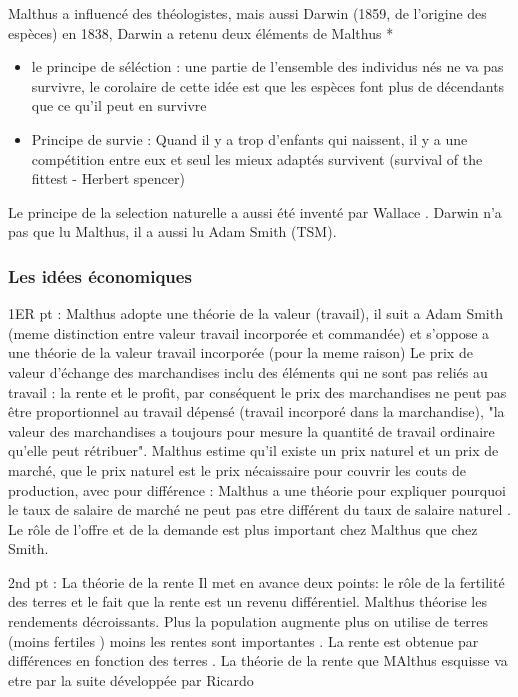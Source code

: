 \documentclass{article}
\begin{document}
Malthus a influencé des théologistes, mais aussi Darwin (1859, de l'origine des espèces) en 1838, Darwin a retenu deux éléments de Malthus *
\begin{itemize}
\item le principe de séléction : une partie de l'ensemble des individus nés ne va pas survivre, le corolaire de cette idée est que les espèces font plus de décendants que ce qu'il peut en survivre 
\item Principe de survie : Quand il y a trop d'enfants qui naissent, il y a une compétition entre eux et seul les mieux adaptés survivent (survival of the fittest - Herbert spencer) 
\end{itemize}
Le principe de la selection naturelle a aussi été inventé par Wallace .
Darwin n'a pas que lu Malthus, il a aussi lu Adam Smith (TSM).

\subsubsection{Les idées économiques}
1ER pt : Malthus adopte une théorie de la valeur (travail), il suit a Adam Smith (meme distinction entre valeur travail incorporée et commandée) et s'oppose a une théorie de la valeur travail incorporée (pour la meme raison) Le prix de valeur d'échange des marchandises inclu des éléments qui ne sont pas reliés au travail : la rente et le profit, par conséquent le prix des marchandises ne peut pas être proportionnel au travail dépensé (travail incorporé dans la marchandise), "la valeur des marchandises a toujours pour mesure la quantité de travail ordinaire qu'elle peut rétribuer". Malthus estime qu'il existe un prix naturel et un prix de marché, que le prix naturel est le prix nécaissaire pour couvrir les couts de production, avec pour différence : Malthus a une théorie pour expliquer pourquoi le taux de salaire de marché ne peut pas etre différent du taux de salaire naturel . Le rôle de l'offre et de la demande est plus important chez Malthus que chez Smith.

2nd pt : La théorie de la rente
Il met en avance deux points: le rôle de la fertilité des terres et le fait que la rente est un revenu différentiel. 
Malthus théorise les rendements décroissants. Plus la population augmente plus on utilise de terres (moins fertiles ) moins les rentes sont importantes .
La rente est obtenue par différences en fonction des terres . La théorie de la rente que MAlthus esquisse va etre par la suite développée par Ricardo
\end{document}
